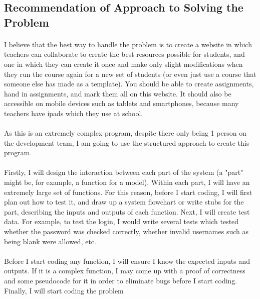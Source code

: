 \subsection{Recommendation of Approach to Solving the Problem}
\paragraph{}
I believe that the best way to handle the problem is to create a website in which teachers can collaborate to create the best resources possible for students, and one in which they can create it once and make only slight modifications when they run the course again for a new set of students (or even just use a course that someone else has made as a template). You should be able to create assignments, hand in assignments, and mark them all on this website. It should also be accessible on mobile devices such as tablets and smartphones, because many teachers have ipads which they use at school.

\paragraph{}
As this is an extremely complex program, despite there only being 1 person on the development team, I am going to use the structured approach to create this program. 

\paragraph{}
Firstly, I will design the interaction between each part of the system (a "part" might be, for example, a function for a model). Within each part, I will have an extremely large set of functions. For this reason, before I start coding, I will first plan out how to test it, and draw up a system flowchart or write stubs for the part, describing the inputs and outputs of each function. Next, I will create test data. For example, to test the login, I would write several tests which tested whether the password was checked correctly, whether invalid usernames such as being blank were allowed, etc.

\paragraph{}
Before I start coding any function, I will ensure I know the expected inputs and outputs. If it is a complex function, I may come up with a proof of correctness and some pseudocode for it in order to eliminate bugs before I start coding. Finally, I will start coding the problem